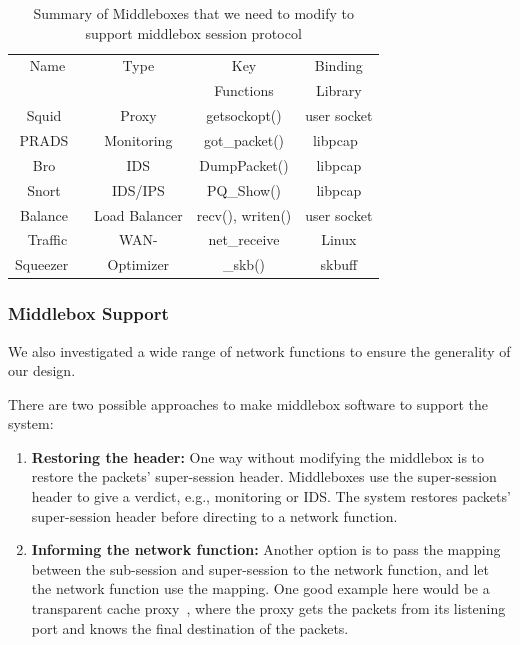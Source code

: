 \begin{table}[t]\label{middleboxextension} 
\centering
 
\small
\begin{tabular} {c |c |c |c}


      Name          	  &         Type           & Key        	 &      Binding   \\
                      	  &                        &  Functions          &       Library  \\ \hline
Squid~\cite{squid} 	  &        Proxy           &  getsockopt()        & user socket  \\ \hline
PRADS~\cite{prads}	  &      Monitoring        &    got\_packet()      & libpcap~\cite{tcpdump}   \\ \hline
Bro~\cite{bro}      	  &      IDS               &   DumpPacket()      & libpcap   \\ \hline
Snort~\cite{snort}  	  &        IDS/IPS         &    PQ\_Show()          & libpcap \\ \hline
Balance~\cite{balance}	  &      Load Balancer     &    recv(), writen()       &user socket\\ \hline
Traffic   		  &    WAN-                &     net\_receive       &Linux  \\ 
Squeezer ~\cite{tsqueezer}&Optimizer &\_skb()   & skbuff \\ \hline


\end{tabular}
\caption{\small Summary of Middleboxes that we need to modify to support middlebox session protocol }
\end{table}

\subsubsection{Middlebox Support}
We also investigated a wide range of network functions to ensure the generality of our design. 

There are two possible approaches to make middlebox software to support the system: 
\begin{enumerate}
 \item \textbf{Restoring the header:} One way without modifying the middlebox is to restore the packets' super-session header. Middleboxes use the super-session header to give a verdict, e.g., monitoring or IDS. The  system restores packets' super-session header before directing to a network function. 
 
 
 \item \textbf{Informing the network function:} Another option is to pass the mapping between the sub-session and super-session to the network function, and let the network function use the mapping. One good example here would be a transparent cache proxy~\cite{squid}, where the proxy gets the packets from its listening port and knows the final destination of the packets. 
\end{enumerate}


